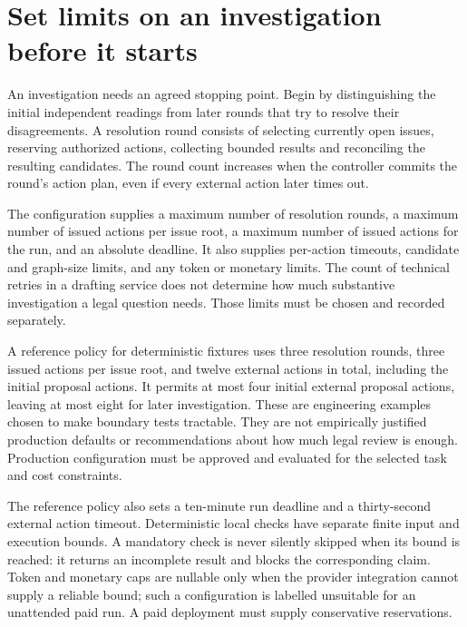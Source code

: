\section{Set limits on an investigation before it starts}
\label{merge:M06:12}


An investigation needs an agreed stopping point. Begin by distinguishing the
initial independent readings from later rounds that try to resolve their
disagreements. A resolution round consists of selecting currently open
issues, reserving authorized actions, collecting bounded results and reconciling
the resulting candidates. The round count increases when the controller commits
the round's action plan, even if every external action later times out.

The configuration supplies a maximum number of resolution rounds, a maximum
number of issued actions per issue root, a maximum number of issued actions for
the run, and an absolute deadline. It also supplies per-action timeouts, candidate
and graph-size limits, and any token or monetary limits. The count of technical retries in a drafting service does not determine how
much substantive investigation a legal question needs. Those limits must be
chosen and recorded separately.

A reference policy for deterministic fixtures uses three resolution rounds,
three issued actions per issue root, and twelve external actions in total,
including the initial proposal actions. It permits at most four initial external
proposal actions, leaving at most eight for later investigation. These are
engineering examples chosen to make boundary tests tractable. They are not
empirically justified production defaults or recommendations about how much
legal review is enough. Production configuration must be approved and evaluated
for the selected task and cost constraints.

The reference policy also sets a ten-minute run deadline and a thirty-second
external action timeout. Deterministic local checks have separate finite input
and execution bounds. A mandatory check is never silently skipped when its bound
is reached: it returns an incomplete result and blocks the corresponding claim.
Token and monetary caps are nullable only when the provider integration cannot
supply a reliable bound; such a configuration is labelled unsuitable for an
unattended paid run. A paid deployment must supply conservative reservations.

